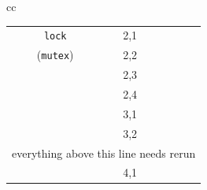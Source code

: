 \begin{table}[t]
\begin{center}
\begin{tabular}{cc}
\begin{tabular}{cc||r|r}
			\hline
			{\tt lock}
			& 2,1 & \cpu{2.49} & \ints{4}		\\ %
			({\tt mutex})
			& 2,2 & \cpu{12.72} & \ints{180}	\\ %
			& 2,3 & \cpu{273.45} & \ints{8356}	\\ %
			& 2,4 & \cpu{13545.35} & \ints{384512}	\\ %
			& 3,1 & \cpu{11.21} & \ints{132}	\\ %
			& 3,2 & \cpu{25434.85} & \ints{718690}	\\ %
			\hline \multicolumn{4}{c}{everything above this line needs rerun} \\
			& 4,1 & \cpu{547.96} & \ints{15064}	\\

\end{tabular}
\end{tabular}
\end{center}
\end{table}
